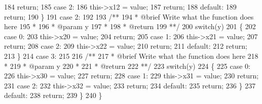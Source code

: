 \begin{DoxyCode}
184                             \textcolor{keywordflow}{return};
185                         \textcolor{keywordflow}{case} 2:
186                             this->x12 = value;
187                             \textcolor{keywordflow}{return};
188                         \textcolor{keywordflow}{default}:
189                             \textcolor{keywordflow}{return};
190                     \}
191                 \textcolor{keywordflow}{case} 2:
192 \textcolor{comment}{}
193 \textcolor{comment}{                    /**}
194 \textcolor{comment}{                     * @brief Write what the function does here}
195 \textcolor{comment}{                     *}
196 \textcolor{comment}{                     * @param y}
197 \textcolor{comment}{                     *}
198 \textcolor{comment}{                     * @return}
199 \textcolor{comment}{                     **/}
200                     \textcolor{keywordflow}{switch}(y)
201                     \{
202                         \textcolor{keywordflow}{case} 0:
203                             this->x20 = value;
204                             \textcolor{keywordflow}{return};
205                         \textcolor{keywordflow}{case} 1:
206                             this->x21 = value;
207                             \textcolor{keywordflow}{return};
208                         \textcolor{keywordflow}{case} 2:
209                             this->x22 = value;
210                             \textcolor{keywordflow}{return};
211                         \textcolor{keywordflow}{default}:
212                             \textcolor{keywordflow}{return};
213                     \}
214                 \textcolor{keywordflow}{case} 3:
215 \textcolor{comment}{}
216 \textcolor{comment}{                    /**}
217 \textcolor{comment}{                     * @brief Write what the function does here}
218 \textcolor{comment}{                     *}
219 \textcolor{comment}{                     * @param y}
220 \textcolor{comment}{                     *}
221 \textcolor{comment}{                     * @return}
222 \textcolor{comment}{                     **/}
223                     \textcolor{keywordflow}{switch}(y)
224                     \{
225                         \textcolor{keywordflow}{case} 0:
226                             this->x30 = value;
227                             \textcolor{keywordflow}{return};
228                         \textcolor{keywordflow}{case} 1:
229                             this->x31 = value;
230                             \textcolor{keywordflow}{return};
231                         \textcolor{keywordflow}{case} 2:
232                             this->x32 = value;
233                             \textcolor{keywordflow}{return};
234                         \textcolor{keywordflow}{default}:
235                             \textcolor{keywordflow}{return};
236                     \}
237                 \textcolor{keywordflow}{default}:
238                     \textcolor{keywordflow}{return};
239             \}
240         \}
\end{DoxyCode}
